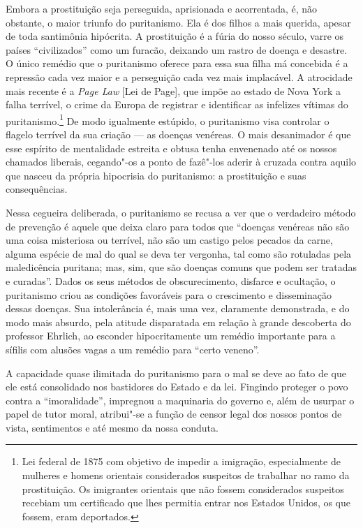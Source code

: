 Embora a prostituição seja perseguida, aprisionada e acorrentada, é, não
obstante, o maior triunfo do puritanismo. Ela é dos filhos a mais
querida, apesar de toda santimônia hipócrita. A prostituição é a
fúria do nosso século, varre os países ``civilizados'' como um furacão,
deixando um rastro de doença e desastre. O único remédio que o
puritanismo oferece para essa sua filha má concebida é a repressão cada
vez maior e a perseguição cada vez mais implacável. A atrocidade mais
recente é a \emph{Page Law} {[}Lei de Page{]}, que impõe ao estado de Nova York
a falha terrível, o crime da Europa de registrar e identificar as
infelizes vítimas do puritanismo.\footnote{Lei federal de 1875 com
  objetivo de impedir a imigração, especialmente de mulheres e homens orientais considerados suspeitos de trabalhar no ramo da prostituição.
  Os imigrantes orientais que não fossem
  considerados suspeitos recebiam um certificado que lhes permitia
  entrar nos Estados Unidos, os que fossem, eram deportados.} De modo
igualmente estúpido, o puritanismo visa controlar o flagelo terrível da
sua criação --- as doenças venéreas. O mais desanimador é que esse
espírito de mentalidade estreita e obtusa tenha envenenado até os nossos
chamados liberais, cegando"-os a ponto de fazê"-los aderir à cruzada
contra aquilo que nasceu da própria hipocrisia do puritanismo: a
prostituição e suas consequências. 

Nessa cegueira deliberada, o
puritanismo se recusa a ver que o verdadeiro método de prevenção é
aquele que deixa claro para todos que ``doenças venéreas não são uma\label{std}
coisa misteriosa ou terrível, não são um castigo pelos pecados da carne,
alguma espécie de mal do qual se deva ter vergonha, tal como são
rotuladas pela maledicência puritana; mas, sim, que são doenças comuns
que podem ser tratadas e curadas''. Dados os seus métodos de
obscurecimento, disfarce e ocultação, o puritanismo criou as condições
favoráveis para o crescimento e disseminação dessas doenças. Sua
intolerância é, mais uma vez, claramente demonstrada, e do modo mais
absurdo, pela atitude disparatada em relação à grande descoberta do
professor Ehrlich, ao esconder hipocritamente um remédio importante para a
sífilis com alusões vagas a um remédio para ``certo veneno''.

A capacidade quase ilimitada do puritanismo para o mal se deve ao fato
de que ele está consolidado nos bastidores do Estado e da lei. Fingindo
proteger o povo contra a ``imoralidade'', impregnou a maquinaria do
governo e, além de usurpar o papel de tutor moral, atribui"-se a função de
censor legal dos nossos pontos de vista, sentimentos e até mesmo da
nossa conduta.

